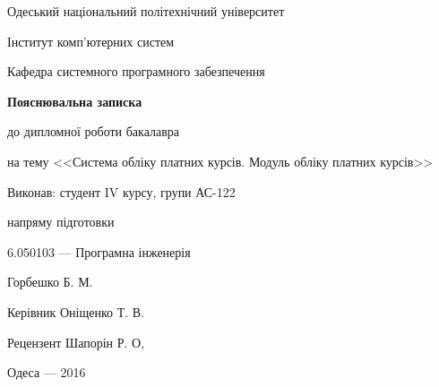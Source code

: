 \documentclass[a4paper,14pt]{article}
\begin{document}

\pagestyle{empty}

\begin{center}
Одеський національний політехнічний університет

Інститут комп'ютерних систем

Кафедра системного програмного забезпечення
\vspace{55mm}

\textbf{Пояснювальна записка}

до дипломної роботи бакалавра

на тему <<Система обліку платних курсів. Модуль обліку платних курсів>>
\end{center}
\vspace{4cm}
\begin{flushright}
\begin{minipage}{9cm}
Виконав: студент IV курсу, групи АС-122

напряму підготовки

6.050103 --- Програмна інженерія

Горбешко Б. М.

Керівник Оніщенко Т. В.

Рецензент Шапорін Р. О,
\end{minipage}
\end{flushright}
\vspace{45mm}
\begin{center}Одеса --- 2016\end{center}
\newpage


\newpage
\makeatletter\renewcommand{\@oddhead}{\hfil\thepage}\makeatother

\def\contentsname{ЗМІСТ}
\tableofcontents
\newpage













\end{document}
